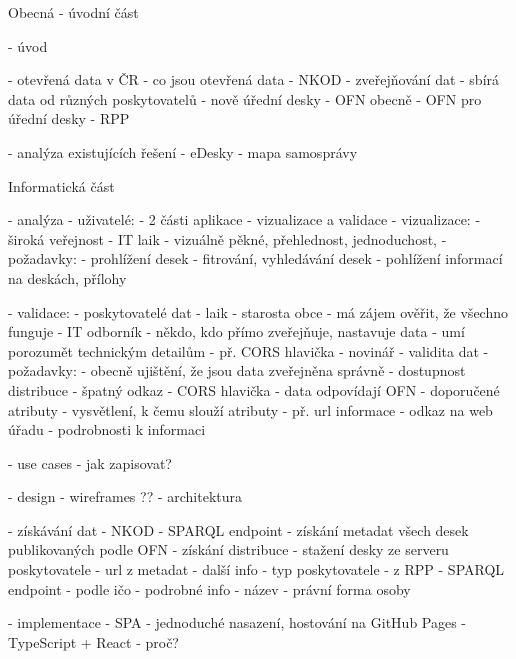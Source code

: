 
Obecná - úvodní část

- úvod

- otevřená data v ČR 
    - co jsou otevřená data
    - NKOD
        - zveřejňování dat
        - sbírá data od různých poskytovatelů
        - nově úřední desky
    - OFN obecně
    - OFN pro úřední desky
    - RPP
    
- analýza existujících řešení
    - eDesky
    - mapa samosprávy
    
Informatická část

- analýza
    - uživatelé:
        - 2 části aplikace - vizualizace a validace
        - vizualizace:
            - široká veřejnost - IT laik
            - vizuálně pěkné, přehlednost, jednoduchost,
            - požadavky:
                - prohlížení desek
                - fitrování, vyhledávání desek
                - pohlížení informací na deskách, přílohy
        
        - validace:
            - poskytovatelé dat
                - laik - starosta obce
                    - má zájem ověřit, že všechno funguje
                - IT odborník 
                    - někdo, kdo přímo zveřejňuje, nastavuje data
                    - umí porozumět technickým detailům
                    - př. CORS hlavička
                - novinář - validita dat
            - požadavky:
                - obecně ujištění, že jsou data zveřejněna správně
                - dostupnost distribuce
                    - špatný odkaz
                    - CORS hlavička
                - data odpovídají OFN - doporučené atributy
                - vysvětlení, k čemu slouží atributy
                    - př. url informace - odkaz na web úřadu - podrobnosti k informaci
                    
    - use cases - jak zapisovat?
    
    - design - wireframes ??
        - architektura
    
- získávání dat
    - NKOD - SPARQL endpoint - získání metadat všech desek publikovaných podle OFN
    - získání distribuce 
        - stažení desky ze serveru poskytovatele
        - url z metadat
    - další info - typ poskytovatele 
        - z RPP - SPARQL endpoint
            - podle ičo - podrobné info
                - název
                - právní forma osoby
                

- implementace
    - SPA - jednoduché nasazení, hostování na GitHub Pages
    - TypeScript + React - proč?